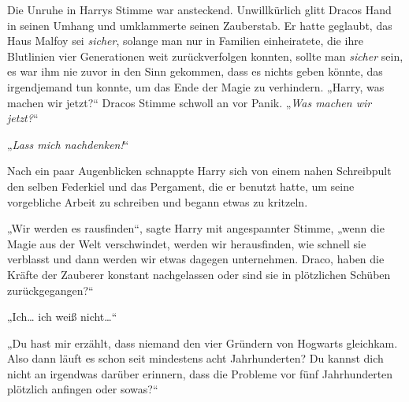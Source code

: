 Die Unruhe in Harrys Stimme war ansteckend. Unwillkürlich glitt Dracos Hand in seinen Umhang und umklammerte seinen Zauberstab. Er hatte geglaubt, das Haus Malfoy sei \emph{sicher}, solange man nur in Familien einheiratete, die ihre Blutlinien vier Generationen weit zurückverfolgen konnten, sollte man \emph{sicher} sein, es war ihm nie zuvor in den Sinn gekommen, dass es nichts geben könnte, das irgendjemand tun konnte, um das Ende der Magie zu verhindern. „Harry, was machen wir jetzt?“ Dracos Stimme schwoll an vor Panik. „\emph{Was machen wir jetzt?}“

„\emph{Lass mich nachdenken!}“

Nach ein paar Augenblicken schnappte Harry sich von einem nahen Schreibpult den selben Federkiel und das Pergament, die er benutzt hatte, um seine vorgebliche Arbeit zu schreiben und begann etwas zu kritzeln.

„Wir werden es rausfinden“, sagte Harry mit angespannter Stimme, „wenn die Magie aus der Welt verschwindet, werden wir herausfinden, wie schnell sie verblasst und dann werden wir etwas dagegen unternehmen. Draco, haben die Kräfte der Zauberer konstant nachgelassen oder sind sie in plötzlichen Schüben zurückgegangen?“

„Ich… ich weiß nicht…“

„Du hast mir erzählt, dass niemand den vier Gründern von Hogwarts gleichkam. Also dann läuft es schon seit mindestens acht Jahrhunderten? Du kannst dich nicht an irgendwas darüber erinnern, dass die Probleme vor fünf Jahrhunderten plötzlich anfingen oder sowas?“

